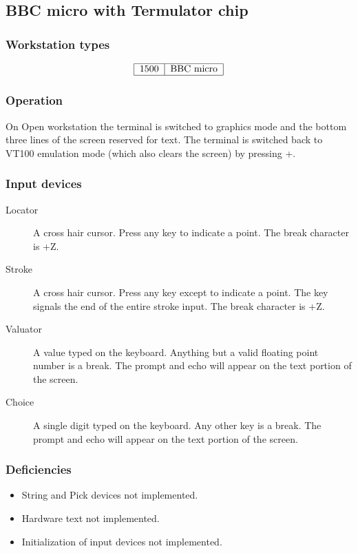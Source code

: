 \subsection{BBC micro with Termulator chip}
\label{bbc}
\subsubsection{Workstation types}
\[\begin{tabular}{|l|l|}\hline
1500 &BBC micro\\\hline
\end{tabular}\]

\subsubsection{Operation}
On Open workstation the terminal is switched to graphics mode and the bottom
three lines of the screen reserved for text.
The terminal is switched back to VT100 emulation mode (which also clears the
screen) by pressing +.

\subsubsection{Input devices}
\begin{description}
\item[Locator] A cross hair cursor.
Press any key to indicate a point.
The break character is +Z.
\item[Stroke] A cross hair cursor.
Press any key except  to indicate a point.
The  key signals the end of the entire stroke input.
The break character is +Z.
\item[Valuator] A value typed on the keyboard.
Anything but a valid floating point number is a break.
The prompt and echo will appear on the text portion of the screen.
\item[Choice] A single digit typed on the keyboard.
Any other key is a break.
The prompt and echo will appear on the text portion of the screen.
\end{description}

\subsubsection{Deficiencies}
\begin{itemize}
\item String and Pick devices not implemented.
\item Hardware text not implemented.
\item Initialization of input devices not implemented.
\end{itemize}

